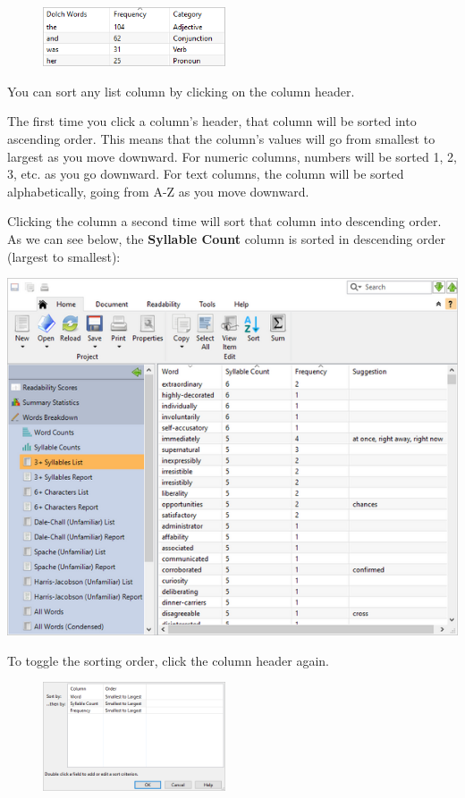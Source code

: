 \documentclass[
]{book}
\theoremstyle{definition}
\theoremstyle{definition}
\theoremstyle{definition}
\theoremstyle{definition}
\theoremstyle{remark}
\begin{document}
\begin{figure}
\includegraphics[width=0.48\textwidth,height=\textheight]{Images/columnheader.png}

\end{figure}

You can sort any list column by clicking on the column header.

The first time you click a column's header, that column will be sorted into ascending order. This means that the column's values will go from smallest to largest as you move downward. For numeric columns, numbers will be sorted 1, 2, 3, etc. as you go downward. For text columns, the column will be sorted alphabetically, going from A-Z as you move downward.

Clicking the column a second time will sort that column into descending order. As we can see below, the \textbf{Syllable Count} column is sorted in descending order (largest to smallest):

\includegraphics{Images/difficultwords.png}

To toggle the sorting order, click the column header again.

\begin{figure}
\includegraphics[width=0.48\textwidth,height=\textheight]{Images/sortcolumnsdialog.png}

\end{figure}
\end{document}

